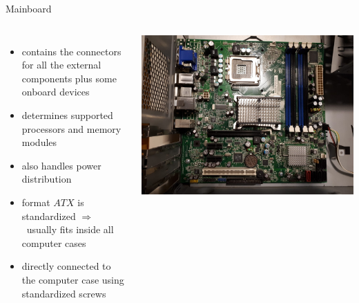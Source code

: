 \documentclass[10pt, graphics, aspectratio=169, table]{beamer}
\newcommand{\ra}{$\Rightarrow$\ }
\begin{document}
    \begin{frame}{Mainboard}
        \begin{columns}
                \begin{itemize}
                    \item contains the connectors for all the external components plus some onboard devices
                    \item determines supported processors and memory modules
                    \item also handles power distribution
                    \item format \(ATX\) is standardized \ra usually fits inside all computer cases
                    \item directly connected to the computer case using standardized screws
                \end{itemize}
                \center\includegraphics[scale=0.1]{img/mainboard.jpeg}
        \end{columns}
    \end{frame}
\end{document}
